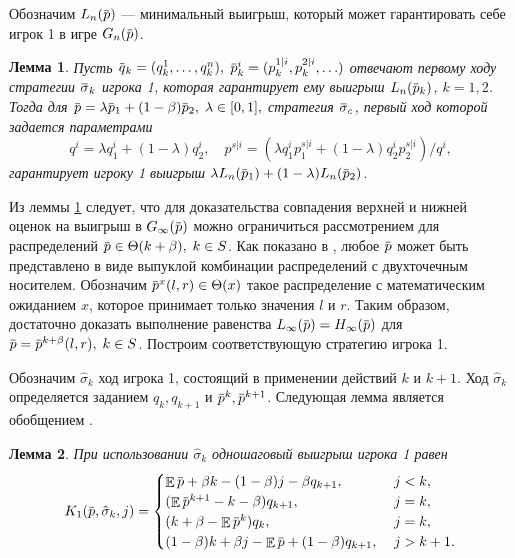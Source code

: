 \documentclass[12pt, draft]{extarticle}
\newtheorem{lemma}{Лемма}
\newcommand{\overbar}[1]%
{\mkern 1.5mu\overline{\mkern-1.3mu#1\mkern-1.3mu}\mkern 1.3mu}
\newcommand{\p}{\ensuremath{\overbar{p}}}
\newcommand{\q}{\ensuremath{\overbar{q}}}
\DeclareMathOperator{\E}{\mathbb{E}}
\newcommand{\G}[1][n]{\ensuremath{G_{#1}}}
\newcommand{\K}[1][n]{\ensuremath{K_{#1}}}
\newcommand{\High}[1][\ensuremath{\infty}]{\ensuremath{H_{#1}}}
\newcommand{\sigmav}{\ensuremath{\overbar{\sigma}}}
\newcommand{\sigmak}{\ensuremath{\hat{\sigma}}}
\newcommand{\Low}[1][\ensuremath{\infty}]{\ensuremath{L_{#1}}}
\begin{document}
Обозначим $\Low[n](\p)$ --- минимальный выигрыш, который может гарантировать
себе игрок 1 в игре $\G(\p)$.
\begin{lemma}
  \label{lower-bound:lemma:convex-combination}
  Пусть %
  $\q_k = (q^1_k, \ldots, q^n_k),$ %
  $\p^i_k = ( p^{1|i}_k, p^{2|i}_k, \ldots)$ %
  отвечают первому ходу стратегии $\sigmav_k$ игрока 1, которая гарантирует ему
  выигрыш $\Low[n](\p_k)$, $k = 1,2$. Тогда для $\p = \lambda \p_1 + (1-\beta)
  \p_2, \; \lambda \in [0, 1],$ стратегия $\sigmav_c$, первый ход которой
  задается параметрами
  \begin{equation}
    \label{lower-bound:eq:q-pi}
    q^i = \lambda q^i_1 + (1-\lambda) q^i_2, \quad
    p^{s|i} = \left(\lambda q^i_1 p^{s|i}_1 + (1-\lambda) q^i_2 p^{s|i}_2\right)/q^i,
  \end{equation}
  гарантирует игроку 1 выигрыш $\lambda \Low[n](\p_1) + (1-\lambda)
  \Low[n](\p_2)$.
\end{lemma}

Из леммы \ref{lower-bound:lemma:convex-combination} следует, что для
доказательства совпадения верхней и нижней оценок на выигрыш в $\G[\infty](\p)$
можно ограничиться рассмотрением для распределений $\p \in \Theta(k + \beta), \;
k \in S$. Как показано в \cite{bib:domansky11}, любое $\p$ может быть
представлено в виде выпуклой комбинации распределений с двухточечным носителем.
Обозначим $\p^x(l, r) \in \Theta(x)$ такое распределение с математическим
ожиданием $x$, которое принимает только значения $l$ и $r$. Таким образом,
достаточно доказать выполнение равенства $\Low(\p) = \High(\p)$ для
$\p = \p^{k+\beta}(l,r), \; k \in S$. Построим соответствующую стратегию игрока 1.

Обозначим $\sigmak_k$ ход игрока 1, состоящий в применении действий $k$ и $k+1$.
Ход $\sigmak_k$ определяется заданием $q_k, q_{k+1}$ и $\p^k, \p^{k+1}$.
Следующая лемма является обобщением \cite[Утверждение 2]{bib:pyanykh16}.
\begin{lemma}
  \label{lower-bound:lemma:stage-payoff}
  При использовании $\sigmak_k$ одношаговый выигрыш игрока 1 равен
  \begin{equation*}
    \K[1](\p, \sigmak_k, j) = \begin{cases}
      \E \p + \beta k - (1-\beta) j - \beta q_{k+1}, &\; j < k, \\
      (\E \p^{k+1} - k - \beta) q_{k+1}, &\; j = k, \\
      (k + \beta - \E \p^k) q_k, &\; j = k, \\
      (1-\beta) k + \beta j - \E \p + (1-\beta) q_{k+1}, &\; j > k + 1.
    \end{cases}
  \end{equation*}
\end{lemma}
\end{document}
